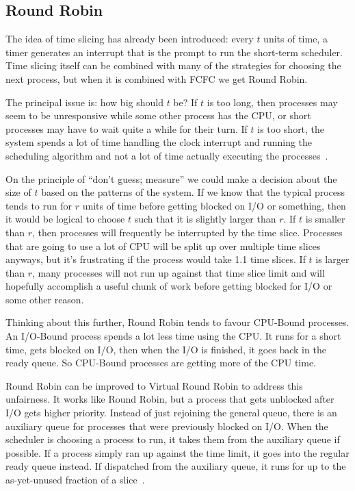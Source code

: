 \subsection*{Round Robin}
The idea of time slicing has already been introduced: every $t$ units of time, a timer generates an interrupt that is the prompt to run the short-term scheduler. Time slicing itself can be combined with many of the strategies for choosing the next process, but when it is combined with FCFC we get Round Robin. 

The principal issue is: how big should $t$ be? If $t$ is too long, then processes may seem to be unresponsive while some other process has the CPU, or short processes may have to wait quite a while for their turn. If $t$ is too short, the system spends a lot of time handling the clock interrupt and running the scheduling algorithm and not a lot of time actually executing the processes~\cite{osi}.

On the principle of ``don't guess; measure'' we could make a decision about the size of $t$ based on the patterns of the system. If we know that the typical process tends to run for $r$ units of time before getting blocked on I/O or something, then it would be logical to choose $t$ such that it is slightly larger than $r$. If $t$ is smaller than $r$, then processes will frequently be interrupted by the time slice. Processes that are going to use a lot of CPU will be split up over multiple time slices anyways, but it's frustrating if the process would take 1.1 time slices. If $t$ is larger than $r$, many processes will not run up against that time slice limit and will hopefully accomplish a useful chunk of work before getting blocked for I/O or some other reason. 

Thinking about this further, Round Robin tends to favour CPU-Bound processes. An I/O-Bound process spends a lot less time using the CPU. It runs for a short time, gets blocked on I/O, then when the I/O is finished, it goes back in the ready queue. So CPU-Bound processes are getting more of the CPU time.

Round Robin can be improved to Virtual Round Robin to address this unfairness. It works like Round Robin, but a process that gets unblocked after I/O gets higher priority. Instead of just rejoining the general queue, there is an auxiliary queue for processes that were previously blocked on I/O. When the scheduler is choosing a process to run, it takes them from the auxiliary queue if possible. If a process simply ran up against the time limit, it goes into the regular ready queue instead. If dispatched from the auxiliary queue, it runs for up to the as-yet-unused fraction of a slice~\cite{vrr}.

